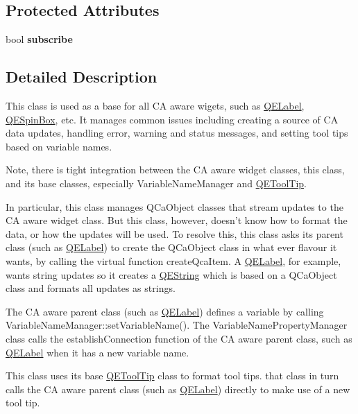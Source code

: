 \subsection*{Protected Attributes}
\begin{DoxyCompactItemize}
\item 
\hypertarget{classQEWidget_a4eb4ffce867222e221d26ec3b98587de}{
bool {\bfseries subscribe}}
\label{classQEWidget_a4eb4ffce867222e221d26ec3b98587de}

\end{DoxyCompactItemize}


\subsection{Detailed Description}
This class is used as a base for all CA aware wigets, such as \hyperlink{classQELabel}{QELabel}, \hyperlink{classQESpinBox}{QESpinBox}, etc. It manages common issues including creating a source of CA data updates, handling error, warning and status messages, and setting tool tips based on variable names.

Note, there is tight integration between the CA aware widget classes, this class, and its base classes, especially VariableNameManager and \hyperlink{classQEToolTip}{QEToolTip}.

In particular, this class manages QCaObject classes that stream updates to the CA aware widget class. But this class, however, doesn't know how to format the data, or how the updates will be used. To resolve this, this class asks its parent class (such as \hyperlink{classQELabel}{QELabel}) to create the QCaObject class in what ever flavour it wants, by calling the virtual function createQcaItem. A \hyperlink{classQELabel}{QELabel}, for example, wants string updates so it creates a \hyperlink{classQEString}{QEString} which is based on a QCaObject class and formats all updates as strings.

The CA aware parent class (such as \hyperlink{classQELabel}{QELabel}) defines a variable by calling VariableNameManager::setVariableName(). The VariableNamePropertyManager class calls the establishConnection function of the CA aware parent class, such as \hyperlink{classQELabel}{QELabel} when it has a new variable name.

This class uses its base \hyperlink{classQEToolTip}{QEToolTip} class to format tool tips. that class in turn calls the CA aware parent class (such as \hyperlink{classQELabel}{QELabel}) directly to make use of a new tool tip.

